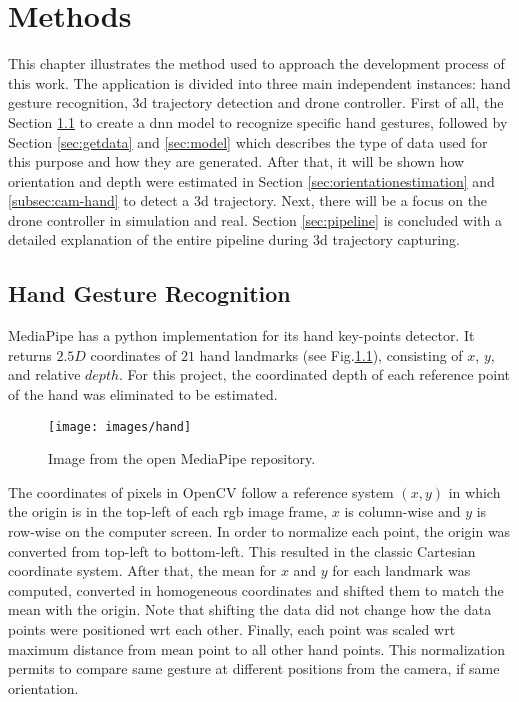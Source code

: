\chapter{Methods}
\label{chap:methods}

This chapter illustrates the method used to approach the development process of this work. The application is divided into three main independent instances: hand gesture recognition, \gls{3d} trajectory detection and drone controller. First of all, the Section \ref{sec:handgestrec} to create a \gls{dnn} model to recognize specific hand gestures, followed by Section \ref{sec:getdata} and \ref{sec:model} which describes the type of data used for this purpose and how they are generated. After that, it will be shown how orientation and depth were estimated in Section \ref{sec:orientationestimation} and \ref{subsec:cam-hand} to detect a \gls{3d} trajectory. Next, there will be a focus on the drone controller in simulation and real. Section \ref{sec:pipeline} is concluded with a detailed explanation of the entire pipeline during \gls{3d} trajectory capturing.


\section{Hand Gesture Recognition}
\label{sec:handgestrec}
MediaPipe has a python implementation for its hand key-points detector. It returns $2.5D$ coordinates of $21$ hand landmarks (see Fig.\ref{fig:handland}), consisting of $x$, $y$, and relative $depth$. For this project, the coordinated depth of each reference point of the hand was eliminated to be estimated.


\begin{figure}[H]
	\centering
	\texttt{[image: images/hand]}
	\caption[Hand Landmarks.]{Image from the open MediaPipe repository.}
	\label{fig:handland}
\end{figure}

\noindent The coordinates of pixels in OpenCV follow a reference system $(x,y)$ in which the origin is in the top-left of each \gls{rgb} image frame, $x$ is column-wise and $y$ is row-wise on the computer screen. In order to normalize each point, the origin was converted from top-left to bottom-left. This resulted in the classic Cartesian coordinate system. After that, the mean for $x$ and $y$ for each landmark was computed, converted in homogeneous coordinates and shifted them to match the mean with the origin. Note that shifting the data did not change how the data points were positioned \gls{wrt} each other. Finally, each point was scaled \gls{wrt} maximum distance from mean point to all other hand points. This normalization permits to compare same gesture at different positions from the camera, if same orientation. 

